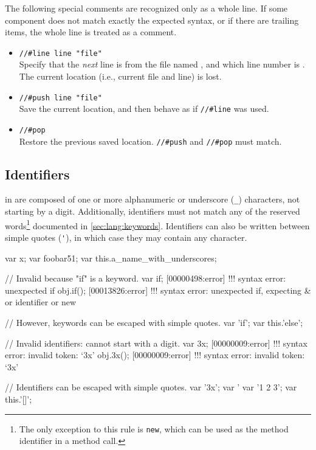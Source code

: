 The following special comments are recognized only as a whole line.
If some component does not match exactly the expected syntax, or if
there are trailing items, the whole line is treated as a comment.
\begin{itemize}
\item \lstinline|//#line line "file"|\\
  Specify that the \emph{next} line is from the file named ,
  and which line number is .  The current location (i.e.,
  current file and line) is lost.

\item \lstinline|//#push line "file"|\\
  Save the current location, and then behave as if \lstinline|//#line|
  was used.

\item \lstinline|//#pop|\\
  Restore the previous saved location.  \lstinline|//#push| and
  \lstinline|//#pop| must match.
\end{itemize}


\subsection{Identifiers}
\label{sec:lang:id}


 in \us are composed of one or more alphanumeric or
underscore (\lstinline|_|) characters, not starting by a digit.
Additionally, identifiers must not match any of the \us reserved
words\footnote{
  The only exception to this rule is \lstinline{new}, which can be
  used as the method identifier in a method call.
} documented in \autoref{sec:lang:keywords}. Identifiers can also be written
between simple quotes (\lstinline|'|), in which case they may contain any
character.

\begin{urbiscript}
var x;
var foobar51;
var this.a_name_with_underscores;

// Invalid because "if" is a keyword.
var if;
[00000498:error] !!! syntax error: unexpected if
obj.if();
[00013826:error] !!! syntax error: unexpected if, expecting & or identifier or new

// However, keywords can be escaped with simple quotes.
var 'if';
var this.'else';

// Invalid identifiers: cannot start with a digit.
var 3x;
[00000009:error] !!! syntax error: invalid token: `3x'
obj.3x();
[00000009:error] !!! syntax error: invalid token: `3x'

// Identifiers can be escaped with simple quotes.
var '3x';
var '%
var '1 2 3';
var this.'[]';
\end{urbiscript}

